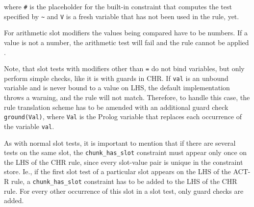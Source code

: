 where \verb|#| is the placeholder for the built-in constraint that computes the test specified by \verb|~| and \verb|V| is a fresh variable that has not been used in the rule, yet.

For arithmetic slot modifiers the values being compared have to be numbers. If a value is not a number, the arithmetic test will fail and the rule cannot be applied \cite{actr_reference}.

Note, that slot tests with modifiers other than \verb|=| do not bind variables, but only perform simple checks, like it is with guards in CHR. If \verb|val| is an unbound variable and is never bound to a value on LHS, the default implementation throws a warning, and the rule will not match. Therefore, to handle this case, the rule translation scheme has to be amended with an additional guard check \verb|ground(Val)|, where \verb|Val| is the Prolog variable that replaces each occurrence of the variable \verb|val|.

As with normal slot tests, it is important to mention that if there are several tests on the same slot, the \verb|chunk_has_slot| constraint must appear only once on the LHS of the CHR rule, since every slot-value pair is unique in the constraint store. Ie., if the first slot test of a particular slot appears on the LHS of the ACT-R rule, a \verb|chunk_has_slot| constraint has to be added to the LHS of the CHR rule. For every other occurrence of this slot in a slot test, only guard checks are added.

